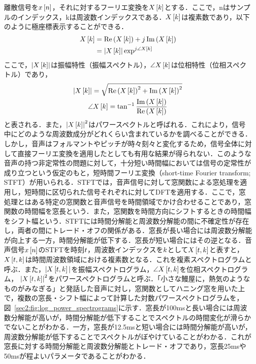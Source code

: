 離散信号を$x\left[n\right]$，それに対するフーリエ変換を$X\left[k\right]$とする．ここで，nはサンプルのインデックス，kは周波数インデックスである．$X\left[k\right]$は複素数であり，以下のように極座標表示することができる．
\begin{align}
    X\left[k\right] & = \Re\left(X\left[k\right]\right) + j\Im\left(X\left[k\right]\right)    \\
                       & = \left|X\left[k\right]\right|\exp^{j\angle X\left[k\right]}
\end{align}
ここで，$\left|X\left[k\right]\right|$は振幅特性（振幅スペクトル），$\angle X\left[k\right]$は位相特性（位相スペクトル）であり，
\begin{gather}
    \left|X\left[k\right]\right| = \sqrt{\Re\left(X\left[k\right]\right)^{2} + \Im\left(X\left[k\right]\right)^{2}} \\
    \angle X\left[k\right] = \tan^{-1} \frac{\Im\left(X\left[k\right]\right)}{\Re\left(X\left[k\right]\right)}
\end{gather}
と表される．また，$\left|X\left[k\right]\right|^2$はパワースペクトルと呼ばれる．これにより，信号中にどのような周波数成分がどれくらい含まれているかを調べることができる．しかし，音声はフォルマントやピッチが時々刻々と変化するため，信号全体に対して直接フーリエ変換を適用したとしても有用な結果が得られない．このような音声の持つ非定常性の問題に対して，十分短い時間幅においては信号の定常性が成り立つという仮定のもと，短時間フーリエ変換（short-time Fourier transform; STFT）が用いられる．STFTでは，音声信号に対して窓関数による窓処理を適用し，短時間に区切られた信号それぞれに対してDFTを適用する．ここで，窓処理とはある特定の窓関数と音声信号を時間領域でかけ合わせることであり，窓関数の時間幅を窓長という．また，窓関数を時間方向にシフトするときの時間幅をシフト幅という．STFTには時間分解能と周波数分解能の間に不確定性が存在し，両者の間にトレード・オフの関係がある．窓長が長い場合には周波数分解能が向上する一方，時間分解能が低下する．窓長が短い場合にはその逆となる．音声信号$x\left[n\right]$のSTFTを時刻$t$，周波数インデックスを$k$として$X\left[t, k\right]$と表すと，$X\left[t, k\right]$は時間周波数領域における複素数となる．これを複素スペクトログラムと呼ぶ．また，$|X\left[t, k\right]|$を振幅スペクトログラム，$\angle X\left[t, k\right]$を位相スペクトログラム，
$\left|X\left[t, k\right]\right|^{2}$をパワースペクトログラムと呼ぶ．「小さな鰻屋に，熱気のようなものがみなぎる」と発話した音声に対し，窓関数としてハニング窓を用いた上で，複数の窓長・シフト幅によって計算した対数パワースペクトログラムを，図~\ref{sec2:fig:log_power_spectrograms}に示す．窓長が100msと長い場合には周波数分解能が高いが，時間分解能が低下することでスペクトルの時間変化が滑らかでないことがわかる．一方，窓長が12.5msと短い場合には時間分解能が高いが，周波数分解能が低下することでスペクトルがぼやけていることがわかる．これが窓長に対する時間分解能と周波数分解能とトレード・オフであり，窓長25msや50msが程よいパラメータであることがわかる．
